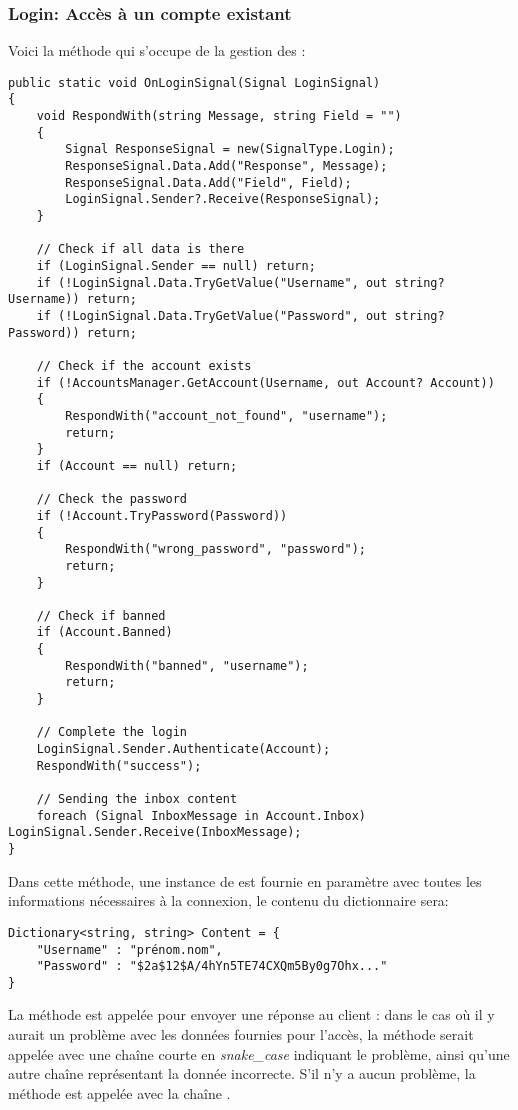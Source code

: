\documentclass{article}
\begin{document}
\subsubsection{Login: Accès à un compte existant}

Voici la méthode qui s'occupe de la gestion des  :

\begin{verbatim}
public static void OnLoginSignal(Signal LoginSignal)
{
    void RespondWith(string Message, string Field = "")
    {
        Signal ResponseSignal = new(SignalType.Login);
        ResponseSignal.Data.Add("Response", Message);
        ResponseSignal.Data.Add("Field", Field);
        LoginSignal.Sender?.Receive(ResponseSignal);
    }

    // Check if all data is there 
    if (LoginSignal.Sender == null) return;
    if (!LoginSignal.Data.TryGetValue("Username", out string? Username)) return;
    if (!LoginSignal.Data.TryGetValue("Password", out string? Password)) return;

    // Check if the account exists 
    if (!AccountsManager.GetAccount(Username, out Account? Account))
    {
        RespondWith("account_not_found", "username");
        return;
    }
    if (Account == null) return;

    // Check the password 
    if (!Account.TryPassword(Password))
    {
        RespondWith("wrong_password", "password");
        return;
    }

    // Check if banned 
    if (Account.Banned)
    {
        RespondWith("banned", "username");
        return;
    }

    // Complete the login
    LoginSignal.Sender.Authenticate(Account);
    RespondWith("success");

    // Sending the inbox content
    foreach (Signal InboxMessage in Account.Inbox) LoginSignal.Sender.Receive(InboxMessage);
}
\end{verbatim}

Dans cette méthode, une instance de  est fournie en paramètre avec toutes les informations nécessaires à la connexion, le contenu du dictionnaire  sera:
\begin{verbatim}
Dictionary<string, string> Content = {
	"Username" : "prénom.nom",
	"Password" : "$2a$12$A/4hYn5TE74CXQm5By0g7Ohx..."
}
\end{verbatim}

La méthode  est appelée pour envoyer une réponse au client : dans le cas où il y aurait un problème avec les données fournies pour l’accès, la méthode serait appelée avec une chaîne courte en \textit{snake\_case} indiquant le problème, ainsi qu’une autre chaîne représentant la donnée incorrecte. S’il n’y a aucun problème, la méthode est appelée avec la chaîne .
\end{document}
